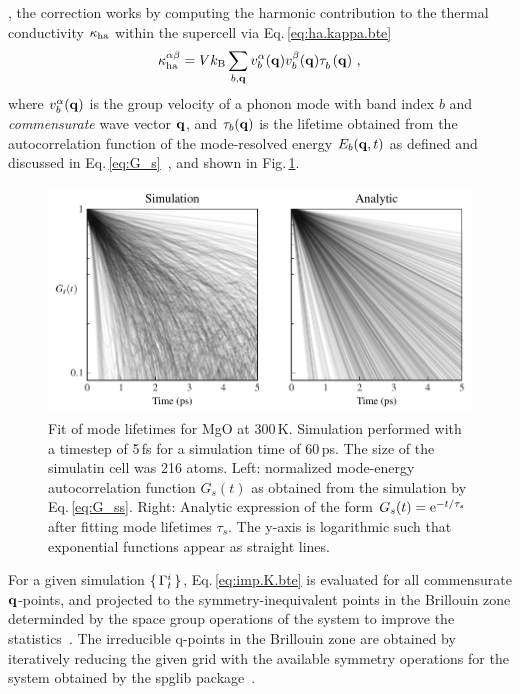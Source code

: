 , the correction works by computing the harmonic contribution to the thermal conductivity $\kappa_{\rm ha}$ within the supercell via Eq.\,\eqref{eq:ha.kappa.bte}
\begin{align}
	\kappa_{\rm ha}^{\alpha \beta} = V k_{\rm B} \sum_{b, {\bf q}} v^\alpha_b ({\bf q}) v^{\beta}_b ({\bf q}) \fD \tau_b ({\bf q})~,
	\label{eq:imp.K.bte}
\end{align}
where $v_b^\alpha ({\bf q})$ is the group velocity of a phonon mode with band index $b$ and \emph{commensurate} wave vector $\bf q$, and $\tau_b ({\bf q})$ is the lifetime obtained from the autocorrelation function of the mode-resolved energy $E_b ({\bf q}, t)$ as defined and discussed in Eq.\,\eqref{eq:G_s}~\cite{Carbogno.2016}, and shown in Fig.\,\ref{fig:G_s}. 
%
%
\begin{figure}
	\includegraphics[width=\textwidth]{./data/plots/lifetimes/greenkubo_summary_interpolation_lifetimes.pdf}
	\caption{Fit of mode lifetimes for MgO at 300\,K. Simulation performed with a timestep of 5\,fs for a simulation time of 60\,ps. The size of the simulatin cell was 216 atoms. Left: normalized mode-energy autocorrelation function $G_s (t)$ as obtained from the simulation by Eq.\,\eqref{eq:G_ss}. Right: Analytic expression of the form $G_s (t) = {\rm e}^{-t / \tau_s}$ after fitting mode lifetimes $\tau_s$. The y-axis is logarithmic such that exponential functions appear as straight lines.}
	\label{fig:G_s}
\end{figure}
%
For a given simulation $\set{\Gamma^i  _t}$, Eq.\,\eqref{eq:imp.K.bte} is evaluated for all commensurate $\bf q$-points, and projected to the symmetry-inequivalent points in the Brillouin zone determinded by the space group operations of the system to improve the statistics~\cite{Maradudin.1968}. The irreducible q-points in the Brillouin zone are obtained by iteratively reducing the given grid with the available symmetry operations for the system obtained by the spglib package~\cite{Spglib}.


